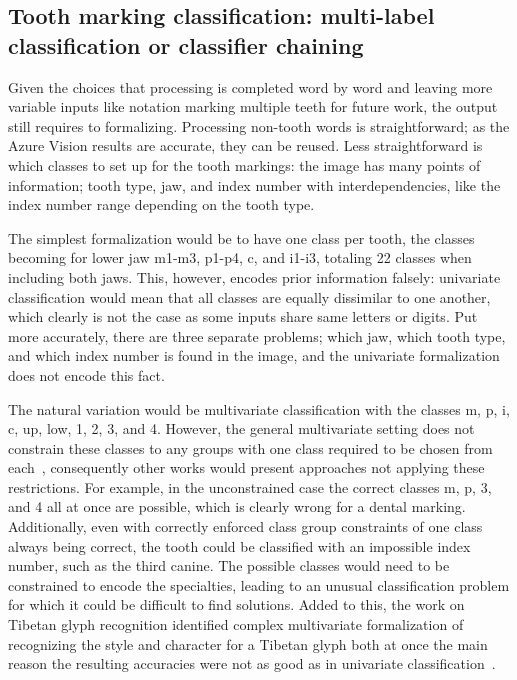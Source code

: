 \documentclass[english,twoside,openright]{UH_DS_MSc}
\begin{document}
\subsection{Tooth marking classification: multi-label classification or classifier chaining}

Given the choices that processing is completed word by word and leaving more variable inputs like 
notation marking multiple teeth for future work, the output still requires to formalizing.
Processing non-tooth words is straightforward; as the Azure Vision results are accurate, they
can be reused. Less straightforward is which classes to set up for the 
tooth markings: the image has many points of information; tooth type, jaw, and index number with 
interdependencies, like the index number range depending on the tooth type.

The simplest formalization would be to have one class per tooth, the classes becoming for lower jaw m1-m3, p1-p4, c, and i1-i3,
totaling 22 classes when including both jaws. This, however, encodes prior information falsely: univariate classification would 
mean that all classes are equally dissimilar to one another, which clearly is not the case as some inputs share same letters or digits.
Put more accurately, there are three separate problems; which jaw, which tooth type, and which index number is found in the image, 
and the univariate formalization does not encode this fact.

The natural variation would be multivariate classification with the classes m, p, i, c, up, low, 1, 2, 3, and 4. However, 
the general multivariate setting does not constrain these classes to any groups with one class required to be chosen from 
each~\cite{multilabel_classification}, consequently other works would present approaches not applying these restrictions.
For example, in the unconstrained case the correct classes m, p, 3, and 4 all at 
once are possible, which is clearly wrong for a dental marking. Additionally, even with correctly enforced class group constraints of one class always being correct, the tooth could be classified with an impossible index number, such as the third canine.
The possible classes would need to be constrained to encode the specialties, leading to an unusual classification problem for which it could be difficult to 
find solutions. Added to this, the work on Tibetan glyph recognition identified complex multivariate formalization of 
recognizing the style and character for a Tibetan glyph both at once the main reason the resulting 
accuracies were not as good as in univariate classification~\cite{4zhaoTibetan}.
\end{document}
